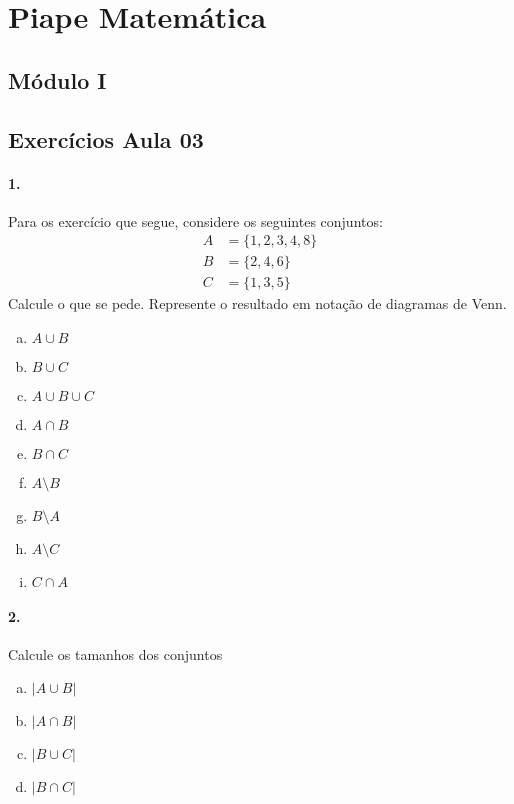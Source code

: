 \documentclass[a4paper,twocolumn,12pt]{article}
\begin{document}
 
\section*{Piape Matemática} 
 
\subsection*{Módulo I}
 
\subsection*{Exercícios Aula 03}

\paragraph{1.} Para os exercício que segue, considere os seguintes conjuntos:
\begin{align*}
A &= \{1,2,3,4,8\}\\
B &=  \{2,4,6\}\\
C &= \{1,3,5\}
\end{align*}
Calcule o que se pede. Represente o resultado em notação de diagramas de Venn.

\medskip

\begin{minipage}[t]{0.45\columnwidth}
  \begin{enumerate}[a)]
    \item \(A\cup B\)
    \item \(B\cup C\)
    \item \(A\cup B \cup C\)
    \item \(A\cap B\)
    \item \(B\cap C\)
  \end{enumerate}
\end{minipage}\begin{minipage}[t]{0.45\columnwidth}
  \begin{enumerate}[a)]
    \setcounter{enumi}{5}
    \item \(A\setminus B\)
    \item \(B\setminus A\)
    \item \(A\setminus C\)
    \item \(C\cap A\)
  \end{enumerate}
\end{minipage} 

\paragraph{2.} Calcule os tamanhos dos conjuntos
\begin{enumerate}[a)]
  \item \(|A\cup B|\)
  \item \(|A\cap B|\)
  \item \(|B\cup C|\)
  \item \(|B\cap C|\)
\end{enumerate}
\end{document}
